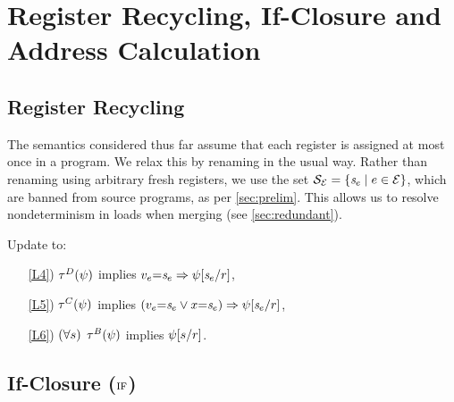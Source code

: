 \section{Register Recycling, If-Closure and Address Calculation}
\label{sec:complications}

\subsection{Register Recycling}

The semantics considered thus far assume that each register is assigned at
most once in a program.  We relax this by renaming in the usual way.  Rather
than renaming using arbitrary fresh registers, we use the set
$\mathcal{S}_{\mathcal{E}}=\{\mathit{s}_{e}\mid e\in\mathcal{E}\}$, which are banned
from source programs, as per \textsection\ref{sec:prelim}.  This allows us to
resolve nondeterminism in loads when merging (see
\textsection\ref{sec:redundant}).


\begin{definition}[$\xRecycle$]
  \label{def:pomsets-if}
  Update  to:
  \begin{enumerate}
  \item[\ref{L4})] 
    $\aTr{\bEvs}{\bForm}$ implies $v_e{=}\mathit{s}_{e}\Rightarrow\psi[\mathit{s}_{e}/r]$, 
  \item[\ref{L5})] 
    $\aTr{\cEvs}{\bForm}$ implies $(v_e{=}\mathit{s}_{e}\lor x{=}\mathit{s}_{e})\allowbreak\Rightarrow\psi[\mathit{s}_{e}/r]$,
  \item[\ref{L6})] 
    $(\forall s)$ $\aTr{\dEvs}{\bForm}$ implies $\psi[s/r]$. 
  \end{enumerate}
\end{definition}

\subsection{If-Closure (${\textsc{if}}$)}
\label{sec:if}




